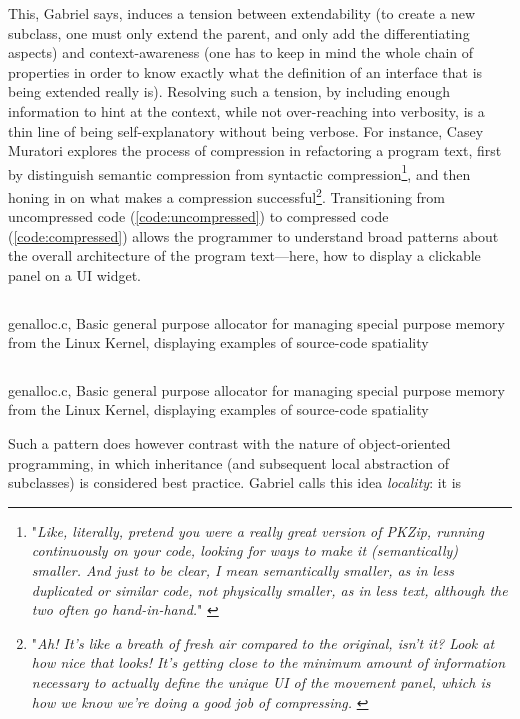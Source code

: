 This, Gabriel says, induces a tension between extendability (to create a new subclass, one must only extend the parent, and only add the differentiating aspects) and context-awareness (one has to keep in mind the whole chain of properties in order to know exactly what the definition of an interface that is being extended really is). Resolving such a tension, by including enough information to hint at the context, while not over-reaching into verbosity, is a thin line of being self-explanatory without being verbose. For instance, Casey Muratori explores the process of compression in refactoring a program text, first by distinguish semantic compression from syntactic compression\footnote{"\emph{Like, literally, pretend you were a really great version of PKZip, running continuously on your code, looking for ways to make it (semantically) smaller. And just to be clear, I mean semantically smaller, as in less duplicated or similar code, not physically smaller, as in less text, although the two often go hand-in-hand.}" \citep{muratori_semantic_2014}}, and then honing in on what makes a compression successful\footnote{"\emph{Ah! It's like a breath of fresh air compared to the original, isn't it? Look at how nice that looks! It's getting close to the minimum amount of information necessary to actually define the unique UI of the movement panel, which is how we know we're doing a good job of compressing.} \citep{muratori_semantic_2014}}. Transitioning from uncompressed code (\ref{code:uncompressed}) to compressed code (\ref{code:compressed}) allows the programmer to understand broad patterns about the overall architecture of the program text—here, how to display a clickable panel on a UI widget.

\begin{listing}
    \inputminted[]{c}{./corpus/uncompressed.c}
    \caption{genalloc.c, Basic general purpose allocator for managing special purpose memory from the Linux Kernel, displaying examples of source-code spatiality \citep{muratori_semantic_2014}}
    \label{code:uncompressed}
\end{listing}

\begin{listing}
    \inputminted[]{c}{./corpus/compressed.c}
    \caption{genalloc.c, Basic general purpose allocator for managing special purpose memory from the Linux Kernel, displaying examples of source-code spatiality \citep{muratori_semantic_2014}}
    \label{code:compressed}
\end{listing}

Such a pattern does however contrast with the nature of object-oriented programming, in which inheritance (and subsequent local abstraction of subclasses) is considered best practice. Gabriel calls this idea \emph{locality}: it is

